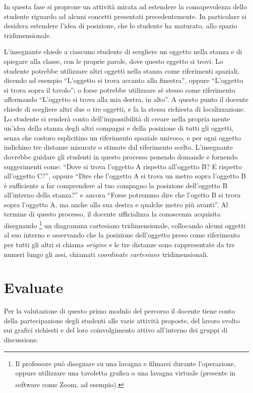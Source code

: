 \documentclass{report} \usepackage[T1]{fontenc} \usepackage[italian]{babel}
\begin{document}
In questa fase si proprone un attività mirata ad estendere la consapevolezza
dello studente riguardo ad alcuni concetti presentati precedentemente.
In particolare si desidera estendere l'idea di posizione, che lo studente ha maturato,
allo spazio tridimensionale.

L'insegnante chiede a ciascuno studente di scegliere un oggetto nella stanza e di
spiegare alla classe, con le proprie parole, dove questo eggetto si trovi.
Lo studente potrebbe utilizzare altri oggetti nella stanza come riferimenti spaziali,
dicendo ad esempio ``L'oggetto si trova accanto alla finestra'', oppure
``L'oggetto si trova sopra il tavolo''; o forse potrebbe utilizzare sè stesso come
riferimento affermando ``L'oggetto si trova alla mia destra, in alto''.
A questo punto il docente chiede di scegliere altri due o tre oggetti,
e fa la stessa richiesta di localizzazione. Lo studente si renderà
conto dell'impossibilità di creare nella propria mente un'idea della stanza
degli altri compagni e della posizione di tutti gli oggetti, senza che
costoro esplicitino un riferimento spaziale univoco, e per ogni oggetto indichino tre distanze
misurate o stimate dal riferimento scelto.
L'insegnante dovrebbe guidare gli studenti in questo processo ponendo domande e fornendo suggerimenti
come: ``Dove si trova l'oggetto A rispetto all'oggetto B? E rispetto all'oggetto C?'',
oppure ``Dire che l'oggetto A si trova un metro sopra l'oggetto B è sufficiente
a far comprendere al tuo compagno la posizione dell'oggetto B all'interno della stanza?''
e ancora ``Forse potremmo dire che l'ogetto B si trova sopra l'oggetto A, ma anche alla sua destra
e qualche metro più avanti''.
Al termine di questo processo, il docente ufficializza la conoscenza acquisita disegnando
\footnote{
Il professore può disegnare su una lavagna e filmarsi durante l'operazione, oppure
utilizzare una tavoletta grafica o una lavagna virtuale (presente in software
come Zoom\textsuperscript{\textregistered}, ad esempio).
}
un diagramma cartesiano tridimensionale, collocando alcuni oggetti al suo interno
e osservando che la posizione dell'oggetto preso come riferimento per tutti gli altri
si chiama \emph{origine} e le tre distanze sono rappresentate da tre numeri lungo
gli assi, chiamati \emph{coordinate cartesiane} tridimensionali.

\section{Evaluate}
Per la valutazione di questo primo modulo del percorso il docente tiene conto della
partecipazione degli studenti alle varie attività proposte, del lavoro svolto sui
grafici richiesti e del loro coinvolgimento attivo all’interno dei gruppi di discussione.
\end{document}
